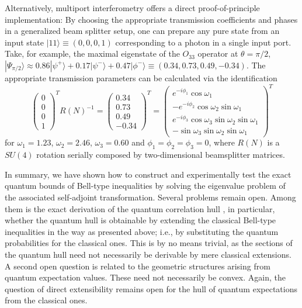 \documentclass[pra,showpacs,showkeys,amsfonts,amsmath]{revtex4}
\begin{document}
Alternatively, multiport interferometry \cite{rzbb,zukowski-97,svozil-2004-analog}
offers a direct proof-of-principle
implementation:
By choosing the appropriate transmission coefficients and phases in a generalized
beam splitter setup, one can prepare any pure state
from an input state $|11 \rangle \equiv (0,0,0,1)$ corresponding to a photon
in a single input port. Take, for example, the maximal eigenstate of
the $O_{33}$ operator at $\theta=\pi/2$, $|\Psi_{\pi/2} \rangle \approx 0.86
  |\psi^+ \rangle + 0.17|\psi^- \rangle + 0.47|\phi^- \rangle \equiv
  (0.34,0.73,0.49,-0.34)$. The appropriate transmission parameters
  can be calculated via the identification \cite{rzbb}
  \begin{equation}
    \begin{pmatrix}0\\0\\0\\1\end{pmatrix}^T R(N)^{-1} =  \begin{pmatrix}0.34\\0.73\\0.49\\-0.34\end{pmatrix}^T =
    \begin{pmatrix}e^{-i\phi_1}\cos\omega_1 \\-e^{-i\phi_2}\cos\omega_2\sin\omega_1\\e^{-i\phi_3}\cos\omega_3\sin\omega_2\sin\omega_1\\-\sin\omega_3\sin\omega_2\sin\omega_1\end{pmatrix}^T
  \end{equation}
for $\omega_1 = 1.23$, $\omega_2=2.46$, $\omega_3=0.60$ and $\phi_1=\phi_2=\phi_3=0$,
where $R(N)$ is a
$SU(4)$ rotation serially composed by two-dimensional beamsplitter
matrices.


In summary, we have shown how to construct and experimentally test
the exact quantum bounds of
Bell-type inequalities
by solving the eigenvalue problem of the associated self-adjoint
transformation.
Several problems remain open.
Among them is
the exact derivation of the quantum correlation hull \cite{pit:range-2001,filipp-svo-04-qpoly},
in particular, whether the quantum hull is obtainable by extending the
classical Bell-type
inequalities in the way as presented above;
i.e., by substituting the quantum probabilities for the classical ones.
This is by no means trivial,
as the sections of the quantum hull need not necessarily be derivable by mere classical extensions.
A second open question is related to the geometric structures arising from quantum expectation values.
These need not necessarily be convex.
Again, the question of direct extensibility remains open for the hull of
quantum expectations from the classical ones.
\end{document}

